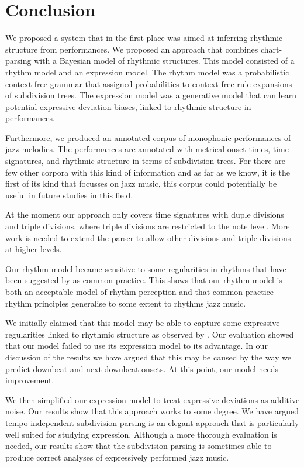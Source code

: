 \chapter{Conclusion}
\label{sec:conclusion}


We proposed a system that in the first place was aimed at inferring rhythmic structure from performances. We proposed an approach that combines chart-parsing with a Bayesian model of rhythmic structures. This model consisted of a rhythm model and an expression model. The rhythm model was a probabilistic context-free grammar that assigned probabilities to context-free rule expansions of subdivision trees. The expression model was a generative model that can learn potential expressive deviation biases, linked to rhythmic structure in performances.

Furthermore, we produced an annotated corpus of monophonic performances of jazz melodies. The performances are annotated with metrical onset times, time signatures, and rhythmic structure in terms of subdivision trees. For there are few other corpora with this kind of information and as far as we know, it is the first of its kind that focusses on jazz music, this corpus could potentially be useful in future studies in this field. 

At the moment our approach only covers time signatures with duple divisions and triple divisions, where triple divisions are restricted to the note level. More work is needed to extend the parser to allow other divisions and triple divisions at higher levels.

Our rhythm model became sensitive to some regularities in rhythms that have been suggested by \citet{temperley2010modeling} as common-practice. This shows that our rhythm model is both an acceptable model of rhythm perception and that common practice rhythm principles generalise to some extent to rhythms jazz music.

We initially claimed that this model may be able to capture some expressive regularities linked to rhythmic structure as observed by \citet{bengtsson1983analysis}. Our evaluation showed that our model failed to use its expression model to its advantage. In our discussion of the results we have argued that this may be caused by the way we predict downbeat and next downbeat onsets. At this point, our model needs improvement.

We then simplified our expression model to treat expressive deviations as additive noise. Our results show that this approach works to some degree. We have argued tempo independent subdivision parsing is an elegant approach that is particularly well suited for studying expression. Although a more thorough evaluation is needed, our results show that the subdivision parsing is sometimes able to produce correct analyses of expressively performed jazz music.